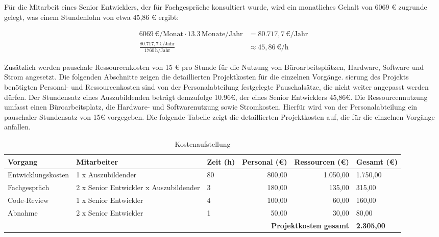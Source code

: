 Für die Mitarbeit eines Senior Entwicklers, der für Fachgespräche konsultiert wurde, wird ein monatliches Gehalt von 6069 € zugrunde gelegt, was einem Stundenlohn von etwa 45,86 € ergibt:

\begin{align}
    6069 \, \text{€/Monat} \cdot 13.3 \, \text{Monate/Jahr} &= 80.717,7 \, \text{€/Jahr} \tag{1}\\
    \frac{80.717,7 \, \text{€/Jahr}}{1760 \, \text{h/Jahr}} &\approx 45,86 \, \text{€/h} \tag{2}
\end{align}

Zusätzlich werden pauschale Ressourcenkosten von 15 € pro Stunde für die Nutzung von Büroarbeitsplätzen, Hardware, Software und Strom angesetzt. Die folgenden Abschnitte zeigen die detaillierten Projektkosten für die einzelnen Vorgänge.
sierung des Projekts benötigten Personal- und Ressourcenkosten sind von der Personalabteilung festgelegte Pauschalsätze, die nicht weiter angepasst werden dürfen. Der Stundensatz eines Auszubildenden beträgt demzufolge 10.96€, der eines Senior Entwicklers 45,86€. Die Ressourcennutzung umfasst einen Büroarbeitsplatz, die Hardware- und Softwarenutzung sowie Stromkosten. Hierfür wird von der Personalabteilung ein pauschaler Stundensatz von 15€ vorgegeben. Die folgende Tabelle zeigt die detaillierten Projektkosten auf, die für die einzelnen Vorgänge anfallen.

\begin{table}[h!]
    \centering
    \footnotesize %
    \renewcommand{\arraystretch}{1.2} %
    \setlength{\tabcolsep}{7pt} %
    \begin{tabular*}{\textwidth}{|p{2.7cm}|p{3.0cm}|p{1.5cm}|r|r|p{1.9cm}|} %
    \hline
    \textbf{Vorgang}       & \textbf{Mitarbeiter}                 & \textbf{Zeit (h)} & \textbf{Personal (€)\footnotemark[6]} & \textbf{Ressourcen (€)\footnotemark[7]} & \textbf{Gesamt (€)} \\ \hline
    Entwicklungskosten     & 1 x Auszubildender                  & 80                & 800,00                 & 1.050,00                 & 1.750,00           \\ \hline
    Fachgespräch           & 2 x Senior Entwickler\newline 1 x Auszubildender & 3                 & 180,00                 & 135,00                   & 315,00             \\ \hline
    Code-Review            & 1 x Senior Entwickler                      & 4                 & 100,00                 & 60,00                    & 160,00             \\ \hline
    Abnahme                & 2 x Senior Entwickler                      & 1                 & 50,00                  & 30,00                    & 80,00              \\ \hline
    \multicolumn{5}{|r|}{\textbf{Projektkosten gesamt}} & \textbf{2.305,00} \\ \hline
    \end{tabular*}
    \caption{Kostenaufstellung}
    \label{tab:Kostenaufstellung}
\end{table}

